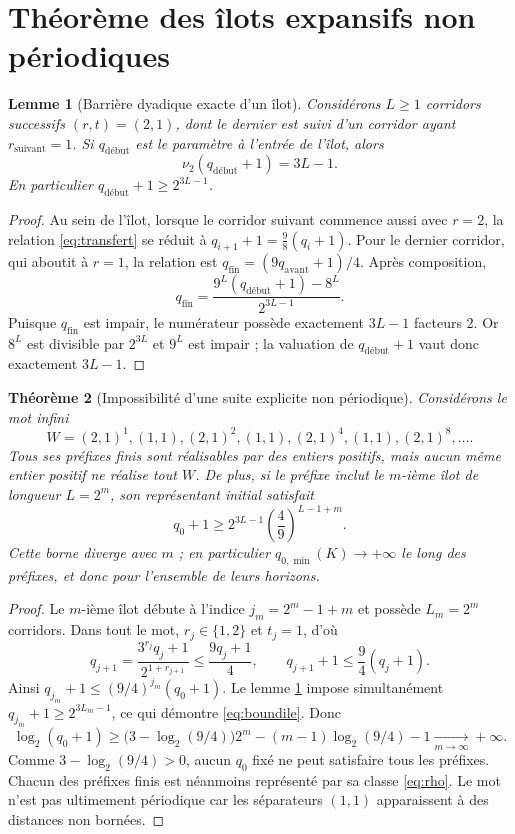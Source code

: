 \documentclass[11pt,a4paper]{article}
\newtheorem{theoreme}{Théorème}[section]
\newtheorem{lemme}[theoreme]{Lemme}
\begin{document}
\section{Théorème des îlots expansifs non périodiques}
\begin{lemme}[Barrière dyadique exacte d'un îlot]\label{lem:ilot}
Considérons $L\ge1$ corridors successifs $(r,t)=(2,1)$, dont le dernier est suivi d'un corridor ayant $r_{\mathrm{suivant}}=1$. Si $q_{\mathrm{début}}$ est le paramètre à l'entrée de l'îlot, alors
\begin{equation}\label{eq:valuation}
\boxed{\nu_2(q_{\mathrm{début}}+1)=3L-1.}
\end{equation}
En particulier $q_{\mathrm{début}}+1\ge2^{3L-1}$.
\end{lemme}
\begin{proof}
Au sein de l'îlot, lorsque le corridor suivant commence aussi avec $r=2$, la relation \eqref{eq:transfert} se réduit à $q_{i+1}+1=\frac98(q_i+1)$. Pour le dernier corridor, qui aboutit à $r=1$, la relation est $q_{\mathrm{fin}}=(9q_{\mathrm{avant}}+1)/4$. Après composition,
\[
q_{\mathrm{fin}}=\frac{9^L(q_{\mathrm{début}}+1)-8^L}{2^{3L-1}}.
\]
Puisque $q_{\mathrm{fin}}$ est impair, le numérateur possède exactement $3L-1$ facteurs $2$. Or $8^L$ est divisible par $2^{3L}$ et $9^L$ est impair ; la valuation de $q_{\mathrm{début}}+1$ vaut donc exactement $3L-1$.
\end{proof}
\begin{theoreme}[Impossibilité d'une suite explicite non périodique]\label{thm:iles}
Considérons le mot infini
\begin{equation}\label{eq:motile}
\boxed{\displaystyle W=(2,1)^{1},(1,1),(2,1)^{2},(1,1),(2,1)^{4},(1,1),(2,1)^{8},\ldots.}
\end{equation}
Tous ses préfixes finis sont réalisables par des entiers positifs, mais \emph{aucun même entier positif} ne réalise tout $W$. De plus, si le préfixe inclut le $m$-ième îlot de longueur $L=2^m$, son représentant initial satisfait
\begin{equation}\label{eq:boundile}
\boxed{\displaystyle q_0+1\ge2^{3L-1}\left(\frac49\right)^{L-1+m}.}
\end{equation}
Cette borne diverge avec $m$ ; en particulier $q_{0,\min}(K)\to+\infty$ le long des préfixes, et donc pour l'ensemble de leurs horizons.
\end{theoreme}
\begin{proof}
Le $m$-ième îlot débute à l'indice $j_m=2^m-1+m$ et possède $L_m=2^m$ corridors. Dans tout le mot, $r_j\in\{1,2\}$ et $t_j=1$, d'où
\[
q_{j+1}=\frac{3^{r_j}q_j+1}{2^{1+r_{j+1}}}
\le\frac{9q_j+1}{4},\qquad
q_{j+1}+1\le\frac94(q_j+1).
\]
Ainsi $q_{j_m}+1\le(9/4)^{j_m}(q_0+1)$. Le lemme \ref{lem:ilot} impose simultanément $q_{j_m}+1\ge 2^{3L_m-1}$, ce qui démontre \eqref{eq:boundile}. Donc
\[
\log_2(q_0+1)\ge\bigl(3-\log_2(9/4)\bigr)2^m
-(m-1)\log_2(9/4)-1\xrightarrow[m\to\infty]{}+\infty.
\]
Comme $3-\log_2(9/4)>0$, aucun $q_0$ fixé ne peut satisfaire tous les préfixes. Chacun des préfixes finis est néanmoins représenté par sa classe \eqref{eq:rho}. Le mot n'est pas ultimement périodique car les séparateurs $(1,1)$ apparaissent à des distances non bornées.
\end{proof}
\end{document}
